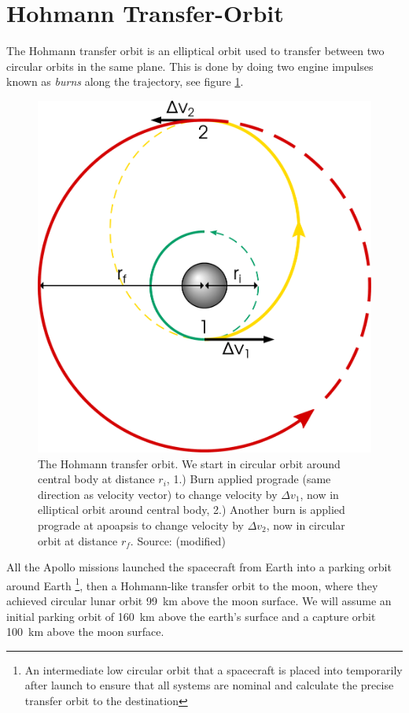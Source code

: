 \section{Hohmann Transfer-Orbit} \label{ch:hohmann}
The Hohmann transfer orbit is an elliptical orbit used to transfer between two circular orbits in the same plane. This is done by doing two engine impulses known as \emph{burns} along the trajectory, see figure \ref{fig:hohmann}.

\begin{figure}[ht!]
\centering
\includegraphics[scale=0.3]{fig/hohmann.pdf}
\caption{The Hohmann transfer orbit. We start in circular orbit around central body at distance $r_i$, 1.) Burn applied prograde (same direction as velocity vector) to change velocity by $\Delta v_1$, now in elliptical orbit around central body, 2.) Another burn is applied prograde at apoapsis to change velocity by $\Delta v_2$, now in circular orbit at distance $r_f$. Source: \cite{fig-hohmann} (modified)}
\label{fig:hohmann}
\end{figure}

All the Apollo missions launched the spacecraft from Earth into a parking orbit around Earth \cite{apollo-parking}\footnote{An intermediate low circular orbit that a spacecraft is placed into temporarily after launch to ensure that all systems are nominal and calculate the precise transfer orbit to the destination}, then a Hohmann-like transfer orbit to the moon, where they achieved circular lunar orbit \SI{99}{\km} above the moon surface. We will assume an initial parking orbit of \SI{160}{\km} above the earth's surface and a capture orbit \SI{100}{\km} above the moon surface.

